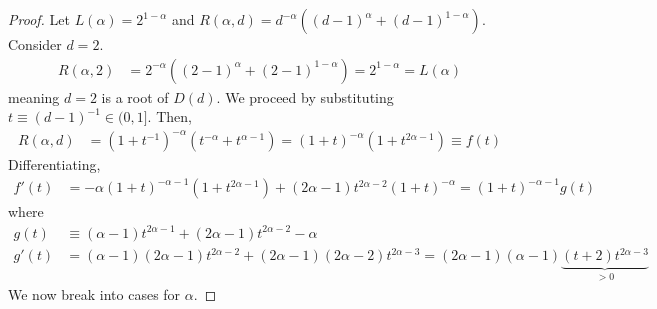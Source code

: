 \documentclass[11pt]{article}
\begin{document}
\begin{proof}
    Let $L(\alpha)=2^{1-\alpha}$ and $R(\alpha,d)=d^{-\alpha}((d-1)^\alpha+(d-1)^{1-\alpha})$. Consider $d=2$. 
    \begin{align*}
        R(\alpha,2)&=2^{-\alpha}((2-1)^\alpha+(2-1)^{1-\alpha})=2^{1-\alpha}=L(\alpha)
    \end{align*}
    meaning $d=2$ is a root of $D(d)$. We proceed by substituting $t\equiv (d-1)^{-1}\in (0,1]$. Then, 
    \begin{align*}
        R(\alpha,d)&=(1+t^{-1})^{-\alpha}(t^{-\alpha}+t^{\alpha-1})=(1+t)^{-\alpha}(1+t^{2\alpha-1})\equiv f(t)
    \end{align*}
    Differentiating,
    \begin{align*}
        f'(t)&=-\alpha(1+t)^{-\alpha-1}(1+t^{2\alpha-1})+(2\alpha-1)t^{2\alpha-2}(1+t)^{-\alpha}
        =(1+t)^{-\alpha-1}g(t)
    \end{align*}
    where
    \begin{align*}
        g(t)&\equiv (\alpha-1)t^{2\alpha-1}+(2\alpha-1)t^{2\alpha-2}-\alpha\\
        g'(t)&=(\alpha-1)(2\alpha-1)t^{2\alpha-2}+(2\alpha-1)(2\alpha-2)t^{2\alpha-3}=(2\alpha-1)(\alpha-1)\underbrace{(t+2)t^{2\alpha-3}}_{>0}
    \end{align*}
    We now break into cases for $\alpha$. 


\end{proof}
\end{document}
